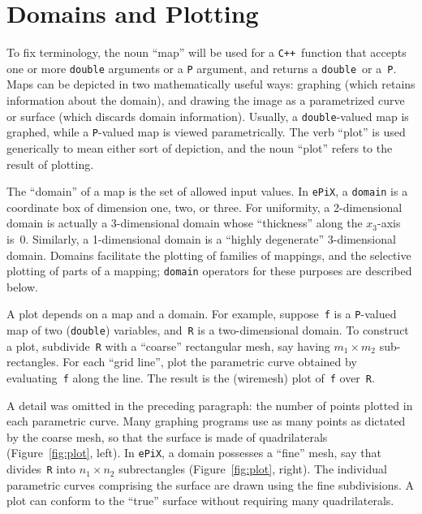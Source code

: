 \documentclass[12pt]{report}
\newcommand{\code}[1]{\texttt{#1}}
\newcommand{\ePiX}{\code{ePiX}}
\newcommand{\CXX}{\code{C++}}
\begin{document}
\section{Domains and Plotting}

 To fix terminology, the noun ``map'' will be
used for a \CXX\ function that accepts one or more \code{double}
arguments or a \code{P} argument, and returns a \code{double}~or
a~\code{P}. Maps can be depicted in two mathematically useful ways:
graphing (which retains information about the domain), and drawing the
image as a parametrized curve or surface (which discards domain
information).  Usually, a \code{double}-valued map is graphed, while a
\code{P}-valued map is viewed parametrically. The verb ``plot'' is
used generically to mean either sort of depiction, and the noun
``plot'' refers to the result of plotting.

The ``domain'' of a map is the set of allowed input values. In \ePiX,
a \code{domain} is a coordinate box of dimension one, two, or three.
For uniformity, a 2-dimensional domain is actually a 3-dimensional
domain whose ``thickness'' along the $x_3$-axis is~0. Similarly, a
1-dimensional domain is a ``highly degenerate'' 3-dimensional domain.
Domains facilitate the plotting of families of mappings, and the
selective plotting of parts of a mapping; \code{domain} operators for
these purposes are described below. 

A plot depends on a map and a domain. For example, suppose~\code{f} is
a \code{P}-valued map of two (\code{double}) variables, and~\code{R}
is a two-dimensional domain. To construct a plot, subdivide~\code{R}
with a ``coarse'' rectangular mesh, say having $m_1\times m_2$
sub-rectangles. For each ``grid line'', plot
the parametric curve obtained by evaluating~\code{f} along the line.
The result is the (wiremesh) plot of~\code{f} over~\code{R}.

A detail was omitted in the preceding paragraph: the number of points
plotted in each parametric curve. Many graphing programs use as many
points as dictated by the coarse mesh, so that the surface is made of
quadrilaterals (Figure~\ref{fig:plot}, left). In \ePiX, a domain
possesses a ``fine'' mesh, say that divides~\code{R} into $n_1\times
n_2$ subrectangles (Figure~\ref{fig:plot}, right).
 The individual parametric curves comprising
the surface are drawn using the fine subdivisions. A plot can conform
to the ``true'' surface without requiring many quadrilaterals.
\end{document}

